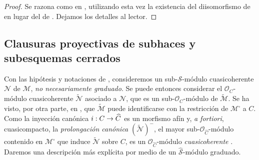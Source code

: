 \documentclass[oneside,10pt]{amsart}
\makeatletter
\newcommand{\ega@arrow}[2]{\mathchoice{#1}{#2}{#2}{#2}}
\renewcommand{\to}{\ega@arrow{\longrightarrow}{\rightarrow}}
\let\EGAOriginalLabel\label
\renewcommand{\label}[1]{\phantomsection\EGAOriginalLabel{#1}}
\makeatother
\begin{document}
\begin{proof}
Se razona como en , utilizando esta vez la existencia del diisomorfismo de  en lugar del de .
Dejamos los detalles al lector.
\end{proof}


\subsection{Clausuras proyectivas de subhaces y subesquemas cerrados}
\label{subsection:II.8.13-fr}

\begin{env}[8.13.1]
\label{II.8.13.1-fr}
Con las hipótesis y notaciones de , consideremos un sub-$\mathcal{S}$-módulo cuasicoherente $\mathcal{N}$ de $\mathcal{M}$, \emph{no necesariamente graduado}.
Se puede entonces considerar el $\mathcal{O}_C$-módulo cuasicoherente $\widetilde{\mathcal{N}}$ asociado a $\mathcal{N}$, que es un sub-$\mathcal{O}_C$-módulo de $\widetilde{\mathcal{M}}$.
Se ha visto, por otra parte, en , que $\widetilde{\mathcal{M}}$ puede identificarse con la restricción de $\mathcal{M}^{\square}$ a $C$.
Como la inyección canónica $i:C\to\widehat{C}$ es un morfismo afín  y, \emph{a fortiori}, cuasicompacto, la \emph{prolongación canónica} $(\widetilde{\mathcal{N}})^{-}$, el mayor sub-$\mathcal{O}_{\widehat{C}}$-módulo contenido en $\mathcal{M}^{\square}$ que induce $\widetilde{\mathcal{N}}$ sobre $C$, es un $\mathcal{O}_{\widehat{C}}$-módulo \emph{cuasicoherente} .
Daremos una descripción más explícita por medio de un $\widehat{\mathcal{S}}$-módulo graduado.
\end{env}
\end{document}
